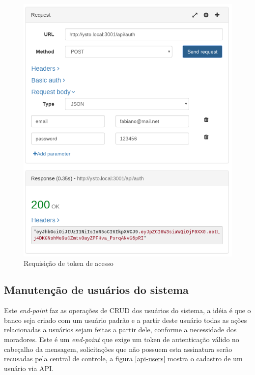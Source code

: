 \begin{figure}[H]
\caption{\label{api-auth} Requisição de token de acesso}
\includegraphics[scale=0.35]{img/06-api-auth.png}
\end{figure}

\subsection{Manutenção de usuários do sistema}
Este \textit{end-point} faz as operações de CRUD dos usuários do sistema, a idéia é que o banco seja criado com um usuário padrão e a partir deste usuário todas as ações relacionadas a usuários sejam feitas a partir dele, conforme a necessidade dos moradores. Este é um \textit{end-point} que exige um token de autenticação válido no cabeçalho da mensagem, solicitações que não possuem esta assinatura serão recusadas pela central de controle, a figura \ref{api-users} mostra o cadastro de um usuário via API.

